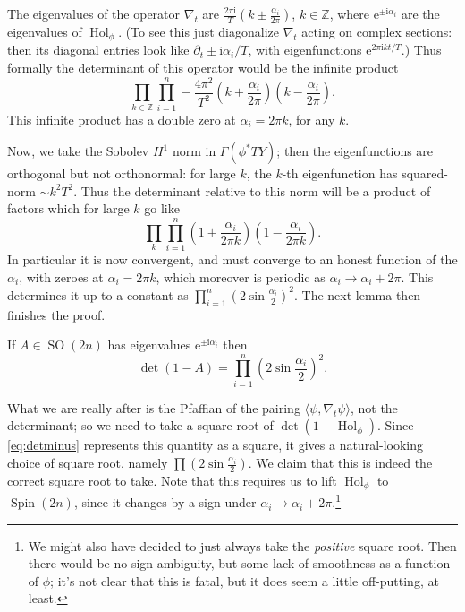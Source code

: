 \documentclass[12pt,letterpaper,reqno]{article}
\numberwithin{equation}{section}
\newcommand{\Z}{\ensuremath{\mathbb Z}}
\newcommand{\I}{{\mathrm i}}
\newcommand{\e}{{\mathrm e}}
\newcommand{\IP}[1]{\langle#1\rangle}
\newcommand{\ti}[1]{\textit{#1}}
\DeclareMathOperator{\Hol}{Hol}
\DeclareMathOperator{\Spin}{Spin}
\DeclareMathOperator{\SO}{SO}
\newcommand{\fixme}[1]{{\color{orange}{[#1]}}}
\begin{document}
\begin{pf} The eigenvalues of the operator $\nabla_t$ are
$\frac{2 \pi \I}{T}(k \pm \frac{\alpha_i}{2\pi})$, $k \in \Z$, where $\e^{\pm \I \alpha_i}$ are the eigenvalues
of $\Hol_\phi$. 
(To see this just diagonalize $\nabla_t$ acting on complex sections:
then its diagonal entries look like $\partial_t \pm \I \alpha_i / T$, with eigenfunctions
$\e^{2 \pi \I k t / T}$.)
Thus formally the determinant of this operator would be the infinite product
\begin{equation}
  \prod_{k \in \Z} \prod_{i=1}^n - \frac{4 \pi^2}{T^2} \left( k + \frac{\alpha_i}{2\pi} \right)\left( k - \frac{\alpha_i}{2\pi} \right).
\end{equation}
This infinite product has a double zero at $\alpha_i = 2 \pi k$, for any $k$.

Now, we take the 
Sobolev $H^1$ norm in $\Gamma(\phi^* TY)$; then the eigenfunctions are orthogonal
but not orthonormal: for large $k$,
the $k$-th eigenfunction has squared-norm $\sim k^2 T^2$. 
Thus the determinant relative to this norm will be a product of factors which
for large $k$ go like
\begin{equation}
  \prod_{k} \prod_{i=1}^n \left( 1 + \frac{\alpha_i}{2\pi k} \right)\left( 1 - \frac{\alpha_i}{2\pi k} \right).
\end{equation}
In particular it is now convergent, and must converge to an honest function of 
the $\alpha_i$, with zeroes at $\alpha_i = 2 \pi k$, which moreover is periodic 
as $\alpha_i \to \alpha_i + 2 \pi$. This determines it
up to a constant as
$\prod_{i=1}^n (2 \sin \frac{\alpha_i}{2})^2$. The next lemma then finishes the proof.
\end{pf}

\begin{lem}
If $A \in \SO(2n)$ has eigenvalues $\e^{\pm \I \alpha_i}$ then
\begin{equation} \label{eq:detminus}
  \det(1 - A) = \prod_{i=1}^n \left( 2 \sin \frac{\alpha_i}{2} \right)^2.
\end{equation}
\end{lem}

\fixme{comment on zeta reg?}

What we are really after is the Pfaffian of the pairing $\IP{\psi, \nabla_t \psi}$, 
not the determinant; so we need to take a square root of $\det(1 - \Hol_\phi)$.
Since \eqref{eq:detminus} represents this quantity as a square, it 
gives a natural-looking choice of square root, namely
$\prod (2 \sin \frac{\alpha_i}{2})$. We claim that this is
indeed the correct square root to take. Note that this
requires us to lift $\Hol_\phi$ to $\Spin(2n)$, since it 
changes by a sign under $\alpha_i \to \alpha_i + 2 \pi$.\footnote{We might
also have decided to just always take the \ti{positive} square root.
Then there would be no sign ambiguity, but some lack of smoothness as a
function of $\phi$; it's not clear that this is fatal, but it does seem
a little off-putting, at least.}
\end{document}
